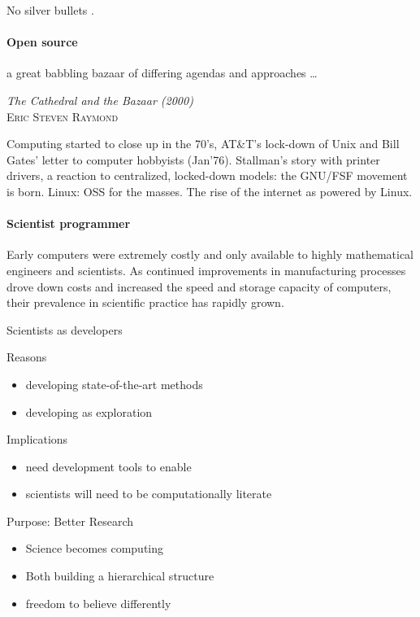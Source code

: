 \documentclass[ChapterTOCs,krantz2]{krantz} %
\begin{document}
No silver bullets \cite{brooks1995mythical}.

\paragraph{ {\bf Open source}}

\setlength{\epigraphrule}{0pt}
\setlength{\epigraphwidth}{.65\textwidth}
\epigraph%
{%
  a great babbling bazaar of differing agendas and approaches \ldots
}%
{\textit{The Cathedral and the Bazaar (2000)}\\ \textsc{Eric Steven Raymond} }

Computing started to close up in the 70's, AT\&T's lock-down of Unix
and Bill Gates' letter to computer hobbyists (Jan'76). Stallman's
story with printer drivers, a reaction to centralized, locked-down
models: the GNU/FSF movement is born. Linux: OSS for the masses. The
rise of the internet as powered by Linux.


\paragraph{ {\bf Scientist programmer}}

Early computers were extremely costly and only available to highly mathematical
engineers and scientists. As continued improvements in manufacturing processes
drove down costs and increased the speed and storage capacity of computers, their
prevalence in scientific practice has rapidly grown.

Scientists as developers

Reasons

\begin{itemize}
\item  developing state-of-the-art methods
\item developing as exploration
\end{itemize}

Implications

\begin{itemize}
\item need development tools to enable
\item scientists will need to be computationally literate
\end{itemize}

Purpose:  Better Research

\begin{itemize}
\item Science becomes computing
\item Both building a hierarchical structure
\item freedom to believe differently
\end{itemize}
\end{document}
